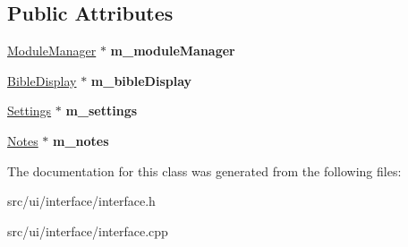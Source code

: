\subsection*{Public Attributes}
\begin{DoxyCompactItemize}
\item 
\hypertarget{classInterface_ac0ac0f58cac87c729084f87ab49ba7c1}{
\hyperlink{classModuleManager}{ModuleManager} $\ast$ {\bfseries m\_\-moduleManager}}
\label{classInterface_ac0ac0f58cac87c729084f87ab49ba7c1}

\item 
\hypertarget{classInterface_a74678b67744b5a7d515c19c033551694}{
\hyperlink{classBibleDisplay}{BibleDisplay} $\ast$ {\bfseries m\_\-bibleDisplay}}
\label{classInterface_a74678b67744b5a7d515c19c033551694}

\item 
\hypertarget{classInterface_ad8618f01430774657bde2d1a503f6190}{
\hyperlink{classSettings}{Settings} $\ast$ {\bfseries m\_\-settings}}
\label{classInterface_ad8618f01430774657bde2d1a503f6190}

\item 
\hypertarget{classInterface_a3719088c02733e8da9cb371b5428b194}{
\hyperlink{classNotes}{Notes} $\ast$ {\bfseries m\_\-notes}}
\label{classInterface_a3719088c02733e8da9cb371b5428b194}

\end{DoxyCompactItemize}


The documentation for this class was generated from the following files:\begin{DoxyCompactItemize}
\item 
src/ui/interface/interface.h\item 
src/ui/interface/interface.cpp\end{DoxyCompactItemize}
